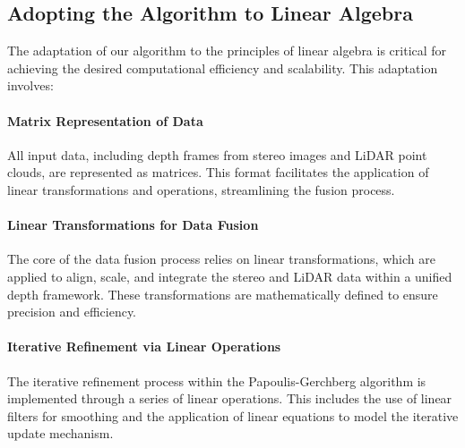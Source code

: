 \documentclass[conference]{IEEEtran}
\begin{document}
\subsection{Adopting the Algorithm to Linear Algebra}

The adaptation of our algorithm to the principles of linear algebra is critical for achieving the desired computational efficiency and scalability. This adaptation involves:

\paragraph{Matrix Representation of Data} 
All input data, including depth frames from stereo images and LiDAR point clouds, are represented as matrices. This format facilitates the application of linear transformations and operations, streamlining the fusion process.

\paragraph{Linear Transformations for Data Fusion}
The core of the data fusion process relies on linear transformations, which are applied to align, scale, and integrate the stereo and LiDAR data within a unified depth framework. These transformations are mathematically defined to ensure precision and efficiency.

\paragraph{Iterative Refinement via Linear Operations} 
The iterative refinement process within the Papoulis-Gerchberg algorithm is implemented through a series of linear operations. This includes the use of linear filters for smoothing and the application of linear equations to model the iterative update mechanism.


\end{document}

